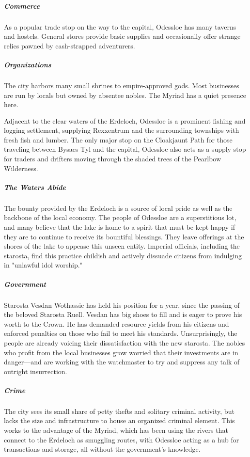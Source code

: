 \documentclass[10pt,a4paper,twoside,bg=print,twocolumn,openany,nodeprecatedcode]{dndbook}
\begin{document}
\subparagraph{Commerce}
As a popular trade stop on the way to the capital, Odessloe has many taverns and hostels. General stores provide basic supplies and occasionally offer strange relics pawned by cash-strapped adventurers.

\subparagraph{Organizations}
The city harbors many small shrines to empire-approved gods. Most businesses are run by locals but owned by absentee nobles. The Myriad has a quiet presence here.

Adjacent to the clear waters of the Erdeloch, Odessloe is a prominent fishing and logging settlement, supplying Rexxentrum and the surrounding townships with fresh fish and lumber. The only major stop on the Cloakjaunt Path for those traveling between Bysaes Tyl and the capital, Odessloe also acts as a supply stop for traders and drifters moving through the shaded trees of the Pearlbow Wilderness.

\subparagraph{The Waters Abide}
The bounty provided by the Erdeloch is a source of local pride as well as the backbone of the local economy. The people of Odessloe are a superstitious lot, and many believe that the lake is home to a spirit that must be kept happy if they are to continue to receive its bountiful blessings. They leave offerings at the shores of the lake to appease this unseen entity. Imperial officials, including the starosta, find this practice childish and actively dissuade citizens from indulging in "unlawful idol worship."

\subparagraph{Government}
Starosta Vesdan Wothassic has held his position for a year, since the passing of the beloved Starosta Ruell. Vesdan has big shoes to fill and is eager to prove his worth to the Crown. He has demanded resource yields from his citizens and enforced penalties on those who fail to meet his standards. Unsurprisingly, the people are already voicing their dissatisfaction with the new starosta. The nobles who profit from the local businesses grow worried that their investments are in danger—and are working with the watchmaster to try and suppress any talk of outright insurrection.

\subparagraph{Crime}
The city sees its small share of petty thefts and solitary criminal activity, but lacks the size and infrastructure to house an organized criminal element. This works to the advantage of the Myriad, which has been using the rivers that connect to the Erdeloch as smuggling routes, with Odessloe acting as a hub for transactions and storage, all without the government's knowledge.
\end{document}
